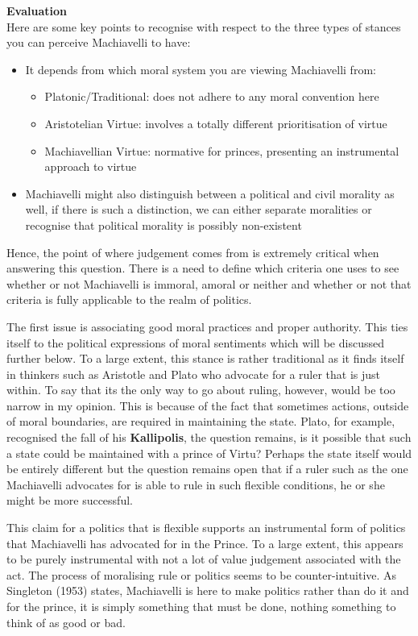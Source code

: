 \documentclass[12pt, letterpaper]{article}
\begin{document}
\textbf{Evaluation}\\
Here are some key points to recognise with respect to the three types of stances you can perceive Machiavelli to have:
\begin{itemize}
	\item It depends from which moral system you are viewing Machiavelli from:
		\begin{itemize}
			\item Platonic/Traditional: does not adhere to any moral convention here
			\item Aristotelian Virtue: involves a totally different prioritisation of virtue
			\item Machiavellian Virtue: normative for princes, presenting an instrumental approach to virtue
		\end{itemize}
	\item Machiavelli might also distinguish between a political and civil morality as well, if there is such a distinction, we can either separate moralities or recognise that political morality is possibly non-existent
\end{itemize}
Hence, the point of where judgement comes from is extremely critical when answering this question. There is a need to define which criteria one uses to see whether or not Machiavelli is immoral, amoral or neither and whether or not that criteria is fully applicable to the realm of politics.

The first issue is associating good moral practices and proper authority. This ties itself to the political expressions of moral sentiments which will be discussed further below. To a large extent, this stance is rather traditional as it finds itself in thinkers such as Aristotle and Plato who advocate for a ruler that is just within. To say that its the only way to go about ruling, however, would be too narrow in my opinion. This is because of the fact that sometimes actions, outside of moral boundaries, are required in maintaining the state. Plato, for example, recognised the fall of his \textbf{Kallipolis}, the question remains, is it possible that such a state could be maintained with a prince of Virtu? Perhaps the state itself would be entirely different but the question remains open that if a ruler such as the one Machiavelli advocates for is able to rule in such flexible conditions, he or she might be more successful.

This claim for a politics that is flexible supports an instrumental form of politics that Machiavelli has advocated for in the Prince. To a large extent, this appears to be purely instrumental with not a lot of value judgement associated with the act. The process of moralising rule or politics seems to be counter-intuitive. As Singleton (1953) states, Machiavelli is here to make politics rather than do it and for the prince, it is simply something that must be done, nothing something to think of as good or bad.
\end{document}
